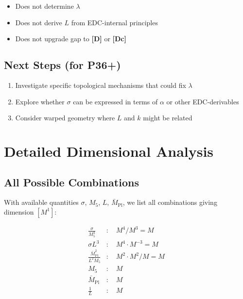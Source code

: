 \documentclass[11pt,a4paper]{article}
\newcommand{\Mpl}{\bar{M}_{\mathrm{Pl}}}
\newcommand{\Mfive}{M_5}
\newcommand{\tagD}{\textbf{[D]}}
\newcommand{\tagDc}{\textbf{[Dc]}}
\theoremstyle{definition}
\theoremstyle{plain}
\theoremstyle{remark}
\begin{document}
\begin{itemize}
\item Does not determine $\lambda$
\item Does not derive $L$ from EDC-internal principles
\item Does not upgrade gap to \tagD{} or \tagDc{}
\end{itemize}

\subsection{Next Steps (for P36+)}

\begin{enumerate}
\item Investigate specific topological mechanisms that could fix $\lambda$
\item Explore whether $\sigma$ can be expressed in terms of $\alpha$ or other EDC-derivables
\item Consider warped geometry where $L$ and $k$ might be related
\end{enumerate}

\appendix

\section{Detailed Dimensional Analysis}
\label{app:dimensional}

\subsection{All Possible Combinations}

With available quantities $\sigma$, $\Mfive$, $L$, $\Mpl$, we list all combinations
giving dimension $[M^1]$:

\begin{align}
\frac{\sigma}{\Mfive^3} &: \quad M^4/M^3 = M \label{eq:app-1} \\
\sigma L^3 &: \quad M^4 \cdot M^{-3} = M \label{eq:app-2} \\
\frac{\Mpl^2}{L^2 \Mfive} &: \quad M^2 \cdot M^2 / M = M \label{eq:app-3} \\
\Mfive &: \quad M \label{eq:app-4} \\
\Mpl &: \quad M \label{eq:app-5} \\
\frac{1}{L} &: \quad M \label{eq:app-6}
\end{align}
\end{document}
